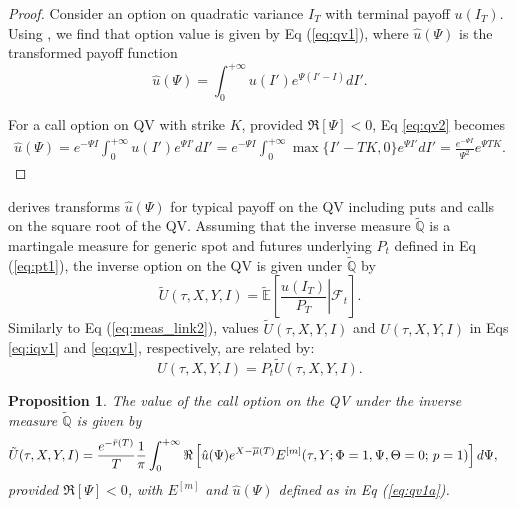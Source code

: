 \documentclass[pdftex,11pt,a4paper] {article}
\newtheorem{proposition}{Proposition}[section]
\begin{document}
\begin{proof}
Consider an option on quadratic variance $I_T$ with terminal payoff $u(I_T)$. Using \cite{Sepp2008}, we find that option value is given by Eq (\ref{eq:qv1}),
where $\hat{u}(\Psi)$ is the transformed payoff function
\begin{equation}\label{eq:qv2}
\hat{u}(\Psi)=\int_0^{+\infty}u(I')e^{\Psi (I'-I)}dI'.
\end{equation}

For a call option on QV with strike $K$, provided $\Re[\Psi]<0$, Eq \eqref{eq:qv2} becomes
\begin{equation*}%
\begin{split}
\hat{u}(\Psi)=e^{-\Psi I}\int_0^{+\infty}u(I')e^{\Psi I'}dI'=e^{-\Psi I}\int_0^{+\infty}\max\{I'-TK,0\}e^{\Psi I'}dI'=
\frac{e^{-\Psi I}}{\Psi^2}e^{\Psi TK}.
\end{split}
\end{equation*} 

\end{proof}
\cite{Sepp2008} derives transforms $\hat{u}(\Psi)$ for typical payoff on the QV including puts and calls on the square root of the QV. Assuming that the inverse measure $\tilde{\mathbb{Q}}$ is a martingale measure for generic spot and futures underlying $P_{t}$ defined in Eq (\ref{eq:pt1}), the inverse option on the QV is given under $\tilde{\mathbb{Q}}$ by
\begin{equation}\label{eq:iqv1}
\tilde{U}(\tau, X, Y, I)=\tilde{\mathbb{E}}\left[\left.\frac{u(I_T)}{P_T}\right|\mathcal{F}_{t}\right].
\end{equation}
Similarly to Eq (\ref{eq:meas_link2}), values $\tilde{U}(\tau, X, Y, I)$ and $U(\tau, X, Y, I)$ in Eqs \eqref{eq:iqv1} and \eqref{eq:qv1}, respectively, are related by:
\begin{equation*}
U(\tau, X, Y, I)=P_t\tilde{U}(\tau, X, Y, I).
\end{equation*}


\begin{proposition}\label{qinv} The value of the call option on the QV under the inverse measure $\tilde{\mathbb{Q}}$ is given by
\begin{equation}\label{eq:iqv1a}
\begin{split}
\tilde{U}(\tau,X,Y,I)&=\frac{e^{-\bar{r}(T)}}{T}\frac{1}{\pi}\int_0^{+\infty}\Re\left[\hat{u}(\Psi) e^{X-\overline{\mu}(T)} E^{[m]}(\tau,Y; \Phi=1,\Psi,\Theta=0;\,p=1)\right]d\Psi,\vspace*{-1.0\baselineskip}
\end{split}
\end{equation}
provided $\Re[\Psi]<0$, with $E^{[m]}$ and $\hat{u}(\Psi)$ defined as in Eq (\ref{eq:qv1a}).
\end{proposition}
\end{document}
